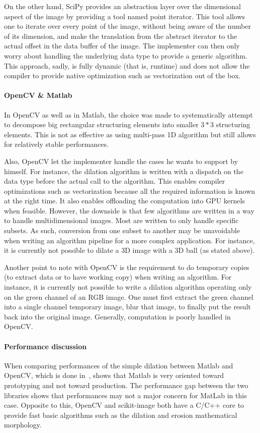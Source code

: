 On the other hand, SciPy provides an abstraction layer over the dimensional aspect of the image by providing a tool
named point iterator. This tool allows one to iterate over every point of the image, without being aware of the number
of its dimension, and make the translation from the abstract iterator to the actual offset in the data buffer of the
image. The implementer can then only worry about handling the underlying data type to provide a generic algorithm. This
approach, sadly, is fully dynamic (that is, runtime) and does not allow the compiler to provide native optimization such
as vectorization out of the box.

\paragraph{OpenCV \& Matlab} In OpenCV as well as in Matlab, the choice was made to systematically attempt to decompose
big rectangular structuring elements into smaller $3*3$ structuring elements. This is not as effective as using
multi-pass 1D algorithm but still allows for relatively stable performances.

Also, OpenCV let the implementer handle the cases he wants to support by himself. For instance, the dilation algorithm
is written with a dispatch on the data type before the actual call to the algorithm. This enables compiler optimizations
such as vectorization because all the required information is known at the right time. It also enables offloading the
computation into GPU kernels when feasible. However, the downside is that few algorithms are written in a way to handle
multidimensional images. Most are written to only handle specific subsets. As such, conversion from one subset to
another may be unavoidable when writing an algorithm pipeline for a more complex application. For instance, it is
currently not possible to dilate a 3D image with a 3D ball (as stated above).

Another point to note with OpenCV is the requirement to do temporary copies (to extract data or to have working copy)
when writing an algorithm. For instance, it is currently not possible to write a dilation algorithm operating only on
the green channel of an RGB image. One must first extract the green channel into a single channel temporary image, blur
that image, to finally put the result back into the original image. Generally,  computation is poorly
handled in OpenCV.

\paragraph{Performance discussion} When comparing performances of the simple dilation between Matlab and OpenCV, which
is done in~\cite{matuska.2012.bench}, shows that Matlab is very oriented toward prototyping and not toward production.
The performance gap between the two libraries shows that performances may not a major concern for MatLab in this case.
Opposite to this, OpenCV and scikit-image both have a C/C++ core to provide fast basic algorithms such as the dilation
and erosion mathematical morphology.

